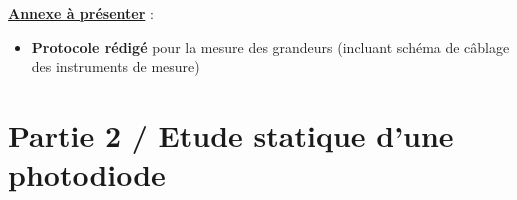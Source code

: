 \noindent
{}

\medskip

\noindent
\underline{\textbf{Annexe à présenter}} :

\begin{itemize}[label=$\square$]
	\item \textbf{Protocole rédigé} pour la mesure des grandeurs (incluant schéma de câblage des instruments de mesure)
\end{itemize}

 

\medskip

\noindent
\begin{minipage}{0.23\linewidth}
\end{minipage}
\hfill
\begin{minipage}{0.23\linewidth}
\end{minipage}
\hfill
\begin{minipage}{0.23\linewidth}
\end{minipage}
\hfill
\begin{minipage}{0.23\linewidth}
\end{minipage}


\section{Partie 2 / Etude statique d'une photodiode}

\noindent
\begin{minipage}{0.48\linewidth}
\end{minipage}
\hfill
\begin{minipage}{0.48\linewidth}
\end{minipage}

